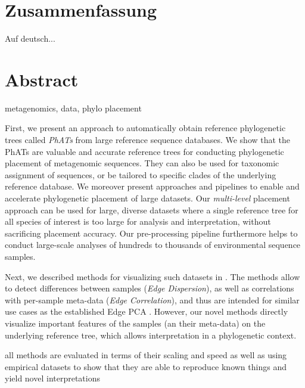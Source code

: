 \section*{Zusammenfassung}
\vspace*{1em}

Auf deutsch...

\blankpage

\section*{Abstract}
\vspace*{1em}

metagenomics, data, phylo placement

First, we present an approach to automatically obtain reference phylogenetic trees
called \emph{\acfp{PhAT}} from large reference sequence databases.
We show that the \acp{PhAT} are valuable and accurate reference trees
for conducting phylogenetic placement of metagenomic sequences.
They can also be used for taxonomic assignment of sequences,
or be tailored to specific clades of the underlying reference database.
We moreover present approaches and pipelines to enable and accelerate phylogenetic placement of large datasets.
Our \emph{multi-level} placement approach can be used for large, diverse datasets
where a single reference tree for all species of interest is too large for analysis and interpretation,
without sacrificing placement accuracy.
Our pre-processing pipeline furthermore helps to conduct large-scale analyses
of hundreds to thousands of environmental sequence samples.

Next, we described methods for visualizing such datasets in .
The methods allow to detect differences between samples (\emph{Edge Dispersion}),
as well as correlations with per-sample meta-data (\emph{Edge Correlation}),
and thus are intended for similar use cases as the established Edge PCA \citep{Matsen2011a}.
However, our novel methods directly visualize important features of the samples (an their meta-data)
on the underlying reference tree, which allows interpretation in a phylogenetic context.

all methods are evaluated in terms of their scaling and speed
as well as
using empirical datasets to show that they are able to reproduce known
things and yield novel interpretations

